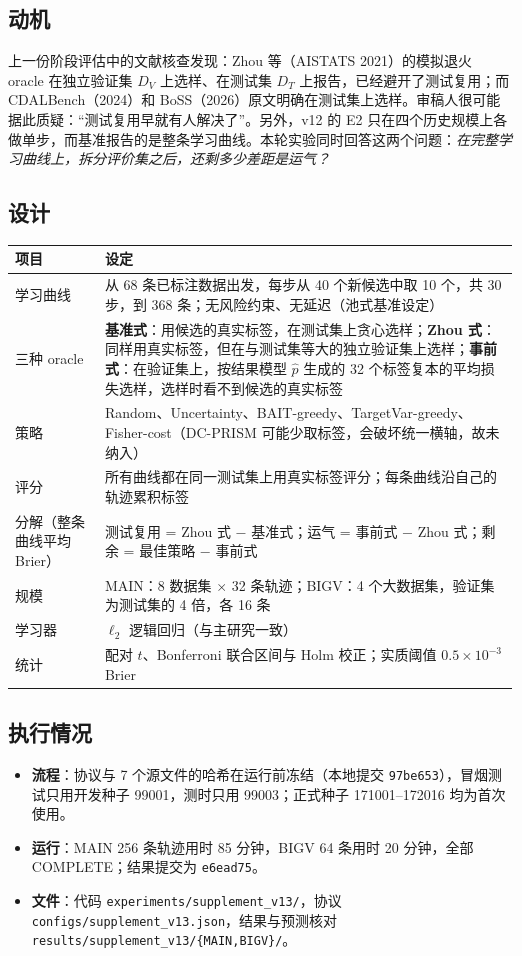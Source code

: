 \documentclass[11pt,a4paper]{article}
\begin{document}
\subsection{动机}
上一份阶段评估中的文献核查发现：Zhou 等（AISTATS 2021）的模拟退火 oracle 在独立验证集 $D_V$ 上选样、在测试集 $D_T$ 上报告，已经避开了测试复用；而 CDALBench（2024）和 BoSS（2026）原文明确在测试集上选样。审稿人很可能据此质疑：“测试复用早就有人解决了”。另外，v12 的 E2 只在四个历史规模上各做单步，而基准报告的是整条学习曲线。本轮实验同时回答这两个问题：\emph{在完整学习曲线上，拆分评价集之后，还剩多少差距是运气？}

\subsection{设计}
\begin{table}[H]
\centering\small
\begin{tabular}{L{3.2cm}L{11.6cm}}
\toprule
项目 & 设定 \\
\midrule
学习曲线 & 从 68 条已标注数据出发，每步从 40 个新候选中取 10 个，共 30 步，到 368 条；无风险约束、无延迟（池式基准设定） \\
三种 oracle & \textbf{基准式}：用候选的真实标签，在测试集上贪心选样；\textbf{Zhou 式}：同样用真实标签，但在与测试集等大的独立验证集上选样；\textbf{事前式}：在验证集上，按结果模型 $\hat p$ 生成的 32 个标签复本的平均损失选样，选样时看不到候选的真实标签 \\
策略 & Random、Uncertainty、BAIT-greedy、TargetVar-greedy、Fisher-cost（DC-PRISM 可能少取标签，会破坏统一横轴，故未纳入） \\
评分 & 所有曲线都在同一测试集上用真实标签评分；每条曲线沿自己的轨迹累积标签 \\
分解（整条曲线平均 Brier）& 测试复用 = Zhou 式 $-$ 基准式；运气 = 事前式 $-$ Zhou 式；剩余 = 最佳策略 $-$ 事前式 \\
规模 & MAIN：8 数据集 $\times$ 32 条轨迹；BIGV：4 个大数据集，验证集为测试集的 4 倍，各 16 条 \\
学习器 & $\ell_2$ 逻辑回归（与主研究一致） \\
统计 & 配对 $t$、Bonferroni 联合区间与 Holm 校正；实质阈值 $0.5\times10^{-3}$ Brier \\
\bottomrule
\end{tabular}
\end{table}

\subsection{执行情况}
\begin{itemize}
\item \textbf{流程}：协议与 7 个源文件的哈希在运行前冻结（本地提交 \texttt{97be653}），冒烟测试只用开发种子 99001，测时只用 99003；正式种子 171001--172016 均为首次使用。
\item \textbf{运行}：MAIN 256 条轨迹用时 85 分钟，BIGV 64 条用时 20 分钟，全部 COMPLETE；结果提交为 \texttt{e6ead75}。
\item \textbf{文件}：代码 \nolinkurl{experiments/supplement_v13/}，协议 \nolinkurl{configs/supplement_v13.json}，结果与预测核对 \texttt{results/supplement\_v13/\{MAIN,BIGV\}/}。
\end{itemize}
\end{document}
